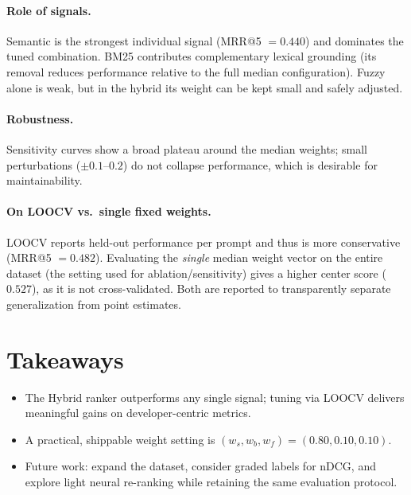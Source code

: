 \paragraph{Role of signals.} Semantic is the strongest individual signal (MRR@5 $=0.440$) and dominates the tuned combination. BM25 contributes complementary lexical grounding (its removal reduces performance relative to the full median configuration). Fuzzy alone is weak, but in the hybrid its weight can be kept small and safely adjusted.

\paragraph{Robustness.} Sensitivity curves show a broad plateau around the median weights; small perturbations ($\pm 0.1$–$0.2$) do not collapse performance, which is desirable for maintainability.

\paragraph{On LOOCV vs.\ single fixed weights.} LOOCV reports held-out performance per prompt and thus is more conservative (MRR@5 $=0.482$). Evaluating the \emph{single} median weight vector on the entire dataset (the setting used for ablation/sensitivity) gives a higher center score ($0.527$), as it is not cross-validated. Both are reported to transparently separate generalization from point estimates.

\section{Takeaways}
\label{sec:evaluation-takeaways}
\begin{itemize}
  \item The Hybrid ranker outperforms any single signal; tuning via LOOCV delivers meaningful gains on developer-centric metrics.
  \item A practical, shippable weight setting is \textbf{$(w_s,w_b,w_f)=(0.80,0.10,0.10)$}.
  \item Future work: expand the dataset, consider graded labels for nDCG, and explore light neural re-ranking while retaining the same evaluation protocol.
\end{itemize}
